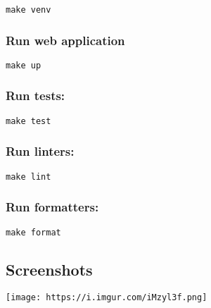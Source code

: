 \begin{verbatim}
make venv
\end{verbatim}

\hypertarget{run-web-application}{%
\subsubsection{Run web application}\label{run-web-application}}

\begin{verbatim}
make up
\end{verbatim}

\hypertarget{run-tests}{%
\subsubsection{Run tests:}\label{run-tests}}

\begin{verbatim}
make test
\end{verbatim}

\hypertarget{run-linters}{%
\subsubsection{Run linters:}\label{run-linters}}

\begin{verbatim}
make lint
\end{verbatim}

\hypertarget{run-formatters}{%
\subsubsection{Run formatters:}\label{run-formatters}}

\begin{verbatim}
make format
\end{verbatim}

\hypertarget{screenshots}{%
\subsection{Screenshots}\label{screenshots}}

\texttt{[image: https://i.imgur.com/iMzyl3f.png]}
